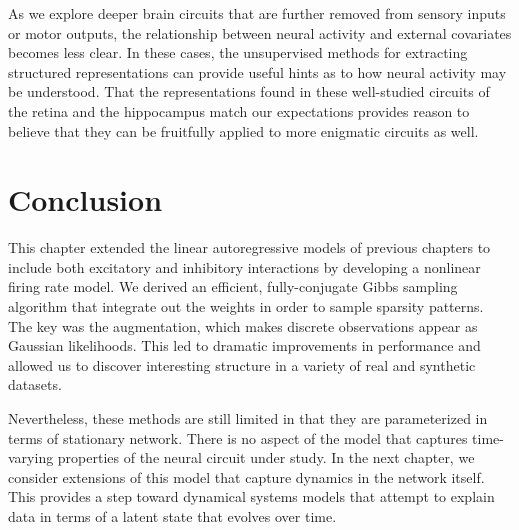 As we explore deeper brain circuits that are further removed from
sensory inputs or motor outputs, the relationship between neural activity
and external covariates becomes less clear. In these cases, the unsupervised
methods for extracting structured representations can provide useful
hints as to how neural activity may be understood. That the representations
found in these well-studied circuits of the retina and the hippocampus
match our expectations provides reason to believe that they can be
fruitfully applied to more enigmatic circuits as well.

\section{Conclusion}
This chapter extended the linear autoregressive models of previous
chapters to include both excitatory and inhibitory interactions by
developing a nonlinear firing rate model.  We derived an efficient,
fully-conjugate Gibbs sampling algorithm that integrate out the
weights in order to sample sparsity patterns. The key was the
\polyagamma augmentation, which makes discrete observations appear as
Gaussian likelihoods. This led to dramatic improvements in performance
and allowed us to discover interesting structure in a variety of real
and synthetic datasets.

Nevertheless, these methods are still limited in that they are
parameterized in terms of stationary network. There is no aspect of
the model that captures time-varying properties of the neural circuit under
study. In the next chapter, we consider extensions of this model that
capture dynamics in the network itself. This provides a step toward
dynamical systems models that attempt to explain data in terms of a
latent state that evolves over time.
